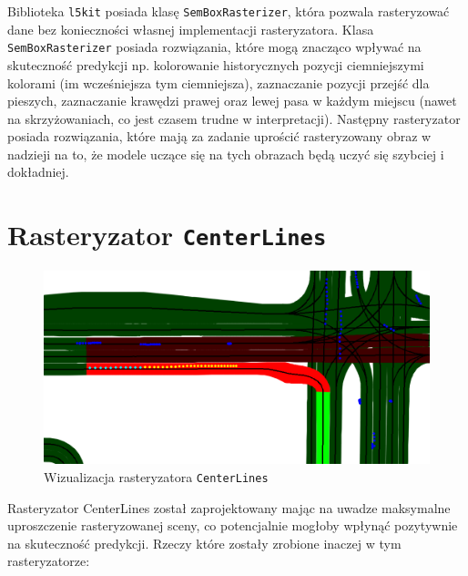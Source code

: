 \newpage

Biblioteka \texttt{l5kit} posiada klasę \texttt{SemBoxRasterizer}, która pozwala rasteryzować dane bez konieczności własnej implementacji rasteryzatora. Klasa \texttt{SemBoxRasterizer} posiada rozwiązania, które mogą znacząco wpływać na skuteczność predykcji np. kolorowanie historycznych pozycji ciemniejszymi kolorami (im wcześniejsza tym ciemniejsza), zaznaczanie pozycji przejść dla pieszych, zaznaczanie krawędzi prawej oraz lewej pasa w każdym miejscu (nawet na skrzyżowaniach, co jest czasem trudne w interpretacji). Następny rasteryzator posiada rozwiązania, które mają za zadanie uprościć rasteryzowany obraz w nadzieji na to, że modele uczące się na tych obrazach będą uczyć się szybciej i dokładniej.

\section{Rasteryzator \texttt{CenterLines}}

\begin{figure}[htbp]
    \centering
    \includegraphics[width=\linewidth]{raster_custom.png}
    \caption{Wizualizacja rasteryzatora \texttt{CenterLines}}
\end{figure}

Rasteryzator CenterLines został zaprojektowany mając na uwadze maksymalne uproszczenie rasteryzowanej sceny, co potencjalnie mogłoby wpłynąć pozytywnie na skuteczność predykcji. Rzeczy które zostały zrobione inaczej w tym rasteryzatorze:


